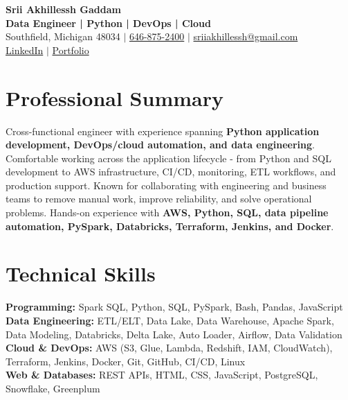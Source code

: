 \documentclass[letterpaper,10pt]{article}
\begin{document}
\fontsize{9.35pt}{10.45pt}\selectfont

\begin{center}
    {\LARGE \textbf{Srii Akhillessh Gaddam}} \\[-1pt]
    \textbf{Data Engineer | Python | DevOps | Cloud} \\[2pt]
    Southfield, Michigan 48034 $|$
    \href{tel:6468752400}{646-875-2400} $|$
    \href{mailto:sriiakhillessh@gmail.com}{sriiakhillessh@gmail.com} \\[1pt]
    \href{https://www.linkedin.com/in/srii-akhiilessh-gaddam-b48668191/}{LinkedIn} $|$
    \href{https://sriiakhillesshg.github.io/portfolio/}{Portfolio}
\end{center}
\vspace{-8pt}

\section{Professional Summary}
\small{Cross-functional engineer with experience spanning \textbf{Python application development, DevOps/cloud automation, and data engineering}. Comfortable working across the application lifecycle - from Python and SQL development to AWS infrastructure, CI/CD, monitoring, ETL workflows, and production support. Known for collaborating with engineering and business teams to remove manual work, improve reliability, and solve operational problems. Hands-on experience with \textbf{AWS, Python, SQL, data pipeline automation, PySpark, Databricks, Terraform, Jenkins, and Docker}.}

\section{Technical Skills}
\small{
\textbf{Programming:} Spark SQL, Python, SQL, PySpark, Bash, Pandas, JavaScript \\
\textbf{Data Engineering:} ETL/ELT, Data Lake, Data Warehouse, Apache Spark, Data Modeling, Databricks, Delta Lake, Auto Loader, Airflow, Data Validation \\
\textbf{Cloud \& DevOps:} AWS (S3, Glue, Lambda, Redshift, IAM, CloudWatch), Terraform, Jenkins, Docker, Git, GitHub, CI/CD, Linux \\
\textbf{Web \& Databases:} REST APIs, HTML, CSS, JavaScript, PostgreSQL, Snowflake, Greenplum
}
\end{document}
